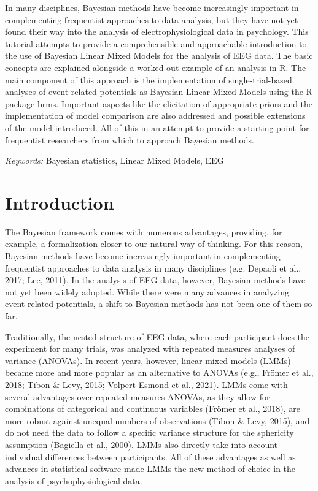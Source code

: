 \documentclass[
  doc,12pt,floatsintext]{apa7}
\begin{document}
\noindent In many disciplines, Bayesian methods have become increasingly important in complementing frequentist approaches to data analysis, but they have not yet found their way into the analysis of electrophysiological data in psychology. This tutorial attempts to provide a comprehensible and approachable introduction to the use of Bayesian Linear Mixed Models for the analysis of EEG data. The basic concepts are explained alongside a worked-out example of an analysis in R. The main component of this approach is the implementation of single-trial-based analyses of event-related potentials as Bayesian Linear Mixed Models using the R package brms. Important aspects like the elicitation of appropriate priors and the implementation of model comparison are also addressed and possible extensions of the model introduced. All of this in an attempt to provide a starting point for frequentist researchers from which to approach Bayesian methods.

\emph{Keywords:} Bayesian statistics, Linear Mixed Models, EEG

\clearpage

\mbox{}\thispagestyle{empty}\clearpage

\newpage

\section{Introduction}\label{introduction}

The Bayesian framework comes with numerous advantages, providing, for example, a formalization closer to our natural way of thinking. For this reason, Bayesian methods have become increasingly important in complementing frequentist approaches to data analysis in many disciplines (e.g. Depaoli et al., 2017; Lee, 2011). In the analysis of EEG data, however, Bayesian methods have not yet been widely adopted. While there were many advances in analyzing event-related potentials, a shift to Bayesian methods has not been one of them so far.

Traditionally, the nested structure of EEG data, where each participant does the experiment for many trials, was analyzed with repeated measures analyses of variance (ANOVAs). In recent years, however, linear mixed models (LMMs) became more and more popular as an alternative to ANOVAs (e.g., Frömer et al., 2018; Tibon \& Levy, 2015; Volpert-Esmond et al., 2021). LMMs come with several advantages over repeated measures ANOVAs, as they allow for combinations of categorical and continuous variables (Frömer et al., 2018), are more robust against unequal numbers of observations (Tibon \& Levy, 2015), and do not need the data to follow a specific variance structure for the sphericity assumption (Bagiella et al., 2000). LMMs also directly take into account individual differences between participants. All of these advantages as well as advances in statistical software made LMMs the new method of choice in the analysis of psychophysiological data.
\end{document}
